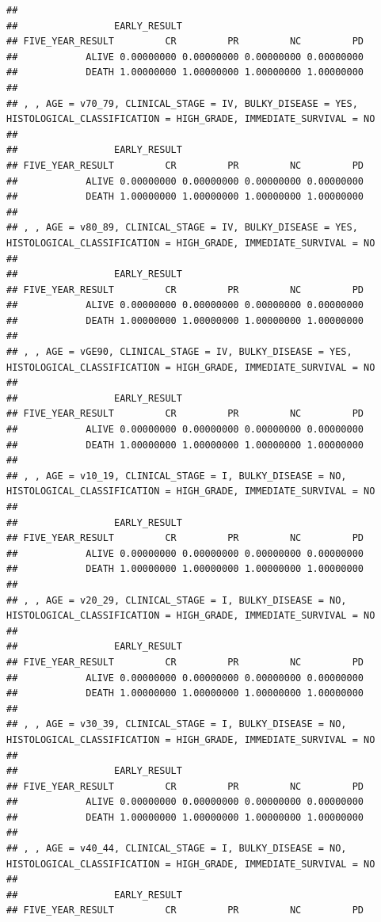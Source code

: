 \documentclass[]{article}
\begin{document}
\begin{verbatim}
## 
##                 EARLY_RESULT
## FIVE_YEAR_RESULT         CR         PR         NC         PD
##            ALIVE 0.00000000 0.00000000 0.00000000 0.00000000
##            DEATH 1.00000000 1.00000000 1.00000000 1.00000000
## 
## , , AGE = v70_79, CLINICAL_STAGE = IV, BULKY_DISEASE = YES, HISTOLOGICAL_CLASSIFICATION = HIGH_GRADE, IMMEDIATE_SURVIVAL = NO
## 
##                 EARLY_RESULT
## FIVE_YEAR_RESULT         CR         PR         NC         PD
##            ALIVE 0.00000000 0.00000000 0.00000000 0.00000000
##            DEATH 1.00000000 1.00000000 1.00000000 1.00000000
## 
## , , AGE = v80_89, CLINICAL_STAGE = IV, BULKY_DISEASE = YES, HISTOLOGICAL_CLASSIFICATION = HIGH_GRADE, IMMEDIATE_SURVIVAL = NO
## 
##                 EARLY_RESULT
## FIVE_YEAR_RESULT         CR         PR         NC         PD
##            ALIVE 0.00000000 0.00000000 0.00000000 0.00000000
##            DEATH 1.00000000 1.00000000 1.00000000 1.00000000
## 
## , , AGE = vGE90, CLINICAL_STAGE = IV, BULKY_DISEASE = YES, HISTOLOGICAL_CLASSIFICATION = HIGH_GRADE, IMMEDIATE_SURVIVAL = NO
## 
##                 EARLY_RESULT
## FIVE_YEAR_RESULT         CR         PR         NC         PD
##            ALIVE 0.00000000 0.00000000 0.00000000 0.00000000
##            DEATH 1.00000000 1.00000000 1.00000000 1.00000000
## 
## , , AGE = v10_19, CLINICAL_STAGE = I, BULKY_DISEASE = NO, HISTOLOGICAL_CLASSIFICATION = HIGH_GRADE, IMMEDIATE_SURVIVAL = NO
## 
##                 EARLY_RESULT
## FIVE_YEAR_RESULT         CR         PR         NC         PD
##            ALIVE 0.00000000 0.00000000 0.00000000 0.00000000
##            DEATH 1.00000000 1.00000000 1.00000000 1.00000000
## 
## , , AGE = v20_29, CLINICAL_STAGE = I, BULKY_DISEASE = NO, HISTOLOGICAL_CLASSIFICATION = HIGH_GRADE, IMMEDIATE_SURVIVAL = NO
## 
##                 EARLY_RESULT
## FIVE_YEAR_RESULT         CR         PR         NC         PD
##            ALIVE 0.00000000 0.00000000 0.00000000 0.00000000
##            DEATH 1.00000000 1.00000000 1.00000000 1.00000000
## 
## , , AGE = v30_39, CLINICAL_STAGE = I, BULKY_DISEASE = NO, HISTOLOGICAL_CLASSIFICATION = HIGH_GRADE, IMMEDIATE_SURVIVAL = NO
## 
##                 EARLY_RESULT
## FIVE_YEAR_RESULT         CR         PR         NC         PD
##            ALIVE 0.00000000 0.00000000 0.00000000 0.00000000
##            DEATH 1.00000000 1.00000000 1.00000000 1.00000000
## 
## , , AGE = v40_44, CLINICAL_STAGE = I, BULKY_DISEASE = NO, HISTOLOGICAL_CLASSIFICATION = HIGH_GRADE, IMMEDIATE_SURVIVAL = NO
## 
##                 EARLY_RESULT
## FIVE_YEAR_RESULT         CR         PR         NC         PD

\end{verbatim}
\end{document}
